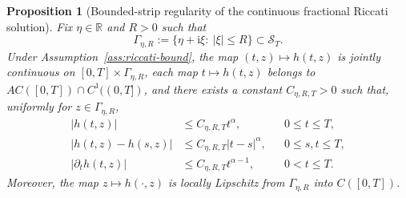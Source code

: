 \documentclass[10pt,a4paper]{amsart}
\newtheorem{proposition}{Proposition}
\newcommand{\R}{\mathbb{R}}
\newcommand{\ii}{\mathrm{i}}
\begin{document}
\begin{proposition}[Bounded-strip regularity of the continuous fractional Riccati solution]
\label{prop:riccati-regularity}
Fix $\eta\in\R$ and $R>0$ such that
\[
  \Gamma_{\eta,R}:=\{\eta+\ii\xi:\ |\xi|\le R\}\subset \mathcal S_T.
\]
Under Assumption~\ref{ass:riccati-bound}, the map $(t,z)\mapsto h(t,z)$ is
jointly continuous on $[0,T]\times\Gamma_{\eta,R}$, each map
$t\mapsto h(t,z)$ belongs to $AC([0,T])\cap C^1((0,T])$, and there exists a
constant $C_{\eta,R,T}>0$ such that, uniformly for $z\in\Gamma_{\eta,R}$,
\begin{align}
  |h(t,z)| &\le C_{\eta,R,T}t^\alpha,
  &&0\le t\le T,\label{eq:h-small-t-prop}\\
  |h(t,z)-h(s,z)| &\le C_{\eta,R,T}|t-s|^\alpha,
  &&0\le s,t\le T,\label{eq:h-holder-t-prop}\\
  |\partial_t h(t,z)| &\le C_{\eta,R,T}t^{\alpha-1},
  &&0<t\le T.\label{eq:h-derivative-t-prop}
\end{align}
Moreover, the map $z\mapsto h(\cdot,z)$ is locally Lipschitz from
$\Gamma_{\eta,R}$ into $C([0,T])$.
\end{proposition}
\end{document}
